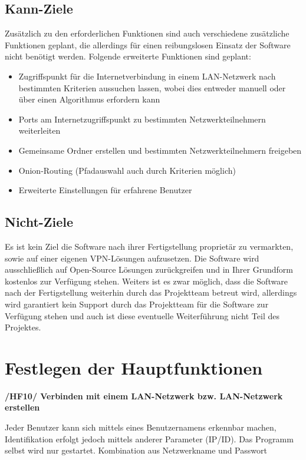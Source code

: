 \documentclass[a4paper,12pt]{scrreprt}
\begin{document}
			
		\subsection{Kann-Ziele}
			Zusätzlich zu den erforderlichen Funktionen sind auch verschiedene zusätzliche Funktionen geplant, die allerdings für einen reibungslosen Einsatz der Software nicht benötigt werden.
			Folgende erweiterte Funktionen sind geplant:
			\begin{itemize}
			\item Zugriffspunkt für die Internetverbindung in einem LAN-Netzwerk nach bestimmten Kriterien aussuchen lassen, wobei dies entweder manuell oder über einen Algorithmus erfordern kann
			
			\item Ports am Internetzugriffspunkt zu bestimmten Netzwerkteilnehmern weiterleiten
			\item Gemeinsame Ordner erstellen und bestimmten Netzwerkteilnehmern freigeben
			
			\item Onion-Routing (Pfadauswahl auch durch Kriterien möglich)
			
			\item Erweiterte Einstellungen für erfahrene Benutzer
			\end{itemize}
			
		\subsection{Nicht-Ziele}
			Es ist kein Ziel die Software nach ihrer Fertigstellung proprietär zu vermarkten, sowie auf einer eigenen VPN-Lösungen aufzusetzen. Die Software wird ausschließlich auf Open-Source Lösungen zurückgreifen und in Ihrer Grundform kostenlos zur Verfügung stehen. Weiters ist es zwar möglich, dass die Software nach der Fertigstellung weiterhin durch das Projektteam betreut wird, allerdings wird garantiert kein Support durch das Projektteam für die Software zur Verfügung stehen und auch ist diese eventuelle Weiterführung nicht Teil des Projektes.
			
	\section{Festlegen der Hauptfunktionen}
		\textbf{/HF10/ Verbinden mit einem LAN-Netzwerk bzw. LAN-Netzwerk erstellen}
		
		Jeder Benutzer kann sich mittels eines Benutzernamens erkennbar machen, Identifikation erfolgt jedoch mittels anderer Parameter (IP/ID). Das Programm selbst wird nur gestartet.
		Kombination aus Netzwerkname und Passwort
		
\end{document}
